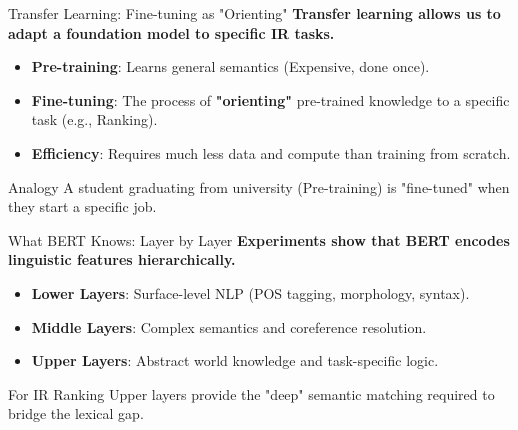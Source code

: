 \documentclass[aspectratio=169]{beamer}
\newif\ifanimated
\newcommand{\cpause}{\ifanimated\pause\fi}
\begin{document}
\begin{frame}{Transfer Learning: Fine-tuning as "Orienting"}
\textbf{Transfer learning allows us to adapt a foundation model to specific IR tasks.}

\vspace{0.8em}
\begin{itemize}
    \item \textbf{Pre-training}: Learns general semantics (Expensive, done once).
    \item \textbf{Fine-tuning}: The process of \textbf{"orienting"} pre-trained knowledge to a specific task (e.g., Ranking).
    \item \textbf{Efficiency}: Requires much less data and compute than training from scratch.
\end{itemize}

\vspace{0.5em}
\cpause
\begin{exampleblock}{Analogy}
A student graduating from university (Pre-training) is "fine-tuned" when they start a specific job.
\end{exampleblock}
\end{frame}

\begin{frame}{What BERT Knows: Layer by Layer}
\textbf{Experiments show that BERT encodes linguistic features hierarchically.}

\vspace{0.8em}
\begin{itemize}
    \item \textbf{Lower Layers}: Surface-level NLP (POS tagging, morphology, syntax).
    \item \textbf{Middle Layers}: Complex semantics and coreference resolution.
    \item \textbf{Upper Layers}: Abstract world knowledge and task-specific logic.
\end{itemize}

\vspace{1em}
\cpause
\begin{alertblock}{For IR Ranking}
Upper layers provide the "deep" semantic matching required to bridge the lexical gap.
\end{alertblock}
\end{frame}
\end{document}
